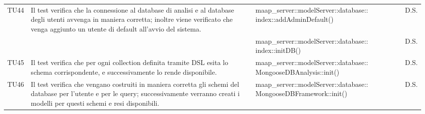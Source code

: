 \begin{center}
\begin{longtable}{|p{1cm}|p{4cm}|p{6cm}|p{2cm}|}
\midrule
TU44
& Il test verifica che la connessione al database di analisi e al database degli utenti avvenga in maniera corretta; inoltre viene verificato che venga aggiunto un utente di default all'avvio del sistema.
& maap\_server::modelServer::database:: index::addAdminDefault()
& D.S.\\
& & maap\_server::modelServer::database:: index::initDB()
& D.S.\\

\midrule
TU45
& Il test verifica che per ogni collection definita tramite DSL esita lo schema corrispondente, e successivamente lo rende disponibile.
& maap\_server::modelServer::database:: MongooseDBAnalysis::init()
& D.S.\\

\midrule
TU46
& Il test verifica che vengano costruiti in maniera corretta gli schemi del database per l'utente e per le query; successivamente verranno creati i modelli per questi schemi e resi disponibili.
& maap\_server::modelServer::database:: MongooseDBFramework::init()
& D.S.\\


\end{longtable}
\end{center}
